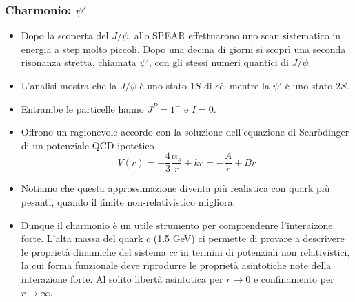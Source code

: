 \subsubsection{Charmonio: $\psi'$}
\begin{itemize}
    \item Dopo la scoperta del $J/\psi$, allo SPEAR effettuarono uno scan sistematico in energia a step molto piccoli. Dopo una decina di giorni si scoprì una seconda risonanza stretta, chiamata $\psi'$, con gli stessi numeri quantici di $J/\psi$.
    \item L'analisi mostra che la $J/\psi$ è uno stato $1S$ di $c\bar c$, mentre la $\psi'$ è uno stato $2S$. 
    \item Entrambe le particelle hanno $J^P=1^-$ e $I=0$.
    \item Offrono un ragionevole accordo con la soluzione dell'equazione di Schrödinger di un potenziale QCD ipotetico
    \begin{equation*}
        V(r)=-\frac43\frac{\alpha_s}{r}+kr=-\frac Ar+Br
    \end{equation*}
    \item Notiamo che questa approssimazione diventa più realistica con quark più pesanti, quando il limite non-relativistico migliora. 
    \item Dunque il charmonio è un utile strumento per comprendenre l'interaizone forte. L'alta massa del quark $c$ (1.5 GeV) ci permette di provare a descrivere le proprietà dinamiche del sistema $c\bar c$ in termini di potenziali non relativistici, la cui forma funzionale deve riprodurre le proprietà asintotiche note della interazione forte. Al solito libertà asintotica per $r\to0$ e confinamento per $r\to\infty$.
\end{itemize}
